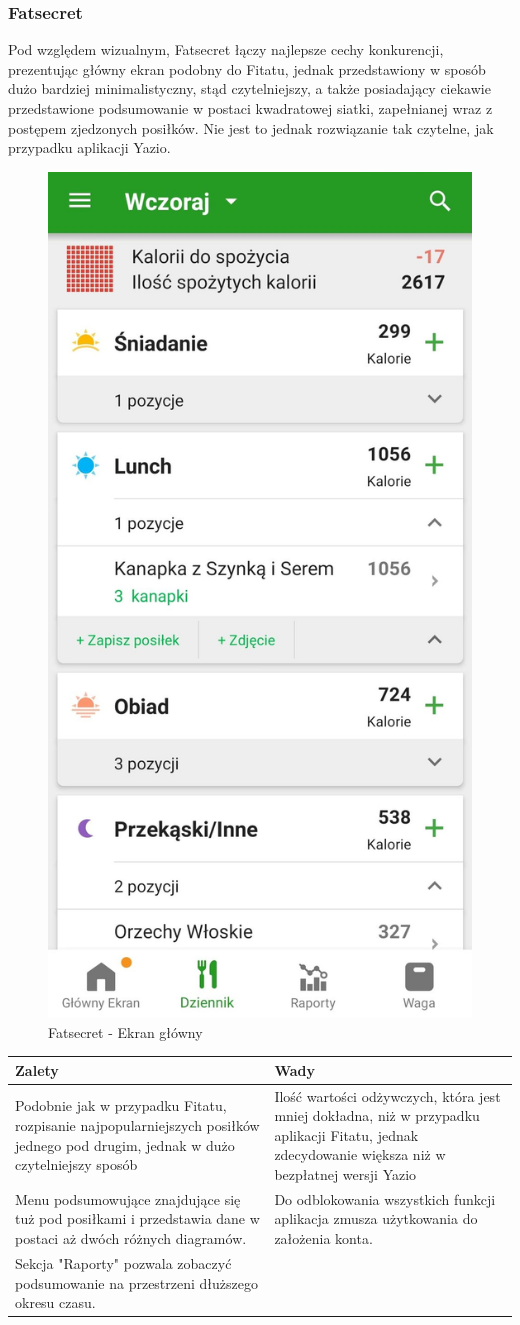 \documentclass[12pt, a4paper]{article}
\begin{document}
\begin{sloppypar}
{{    \subsubsection{Fatsecret}
    {
      Pod względem wizualnym, Fatsecret łączy najlepsze cechy konkurencji, prezentując
      główny ekran podobny do Fitatu, jednak przedstawiony w sposób dużo bardziej 
      minimalistyczny, stąd czytelniejszy, a także posiadający ciekawie przedstawione 
      podsumowanie w postaci kwadratowej siatki, zapełnianej wraz z postępem zjedzonych posiłków.
      Nie jest to jednak rozwiązanie tak czytelne, jak przypadku aplikacji Yazio.
      \begin{figure}[H]
        \centering
        \includegraphics[width=.3\textwidth]{fatsecret_1.png}
        \caption{Fatsecret - Ekran główny}
        \label{fig:fat1}
      \end{figure} 
      
      \begin{center}
        \begin{tabularx}{ \textwidth } {
          | >{\centering\arraybackslash}X
          | >{\centering\arraybackslash}X
          | }
         \hline
         \bfseries Zalety & \bfseries Wady \\
         \hline
         Podobnie jak w przypadku Fitatu, rozpisanie najpopularniejszych posiłków
         jednego pod drugim, jednak w dużo czytelniejszy sposób & 
         Ilość wartości odżywczych, która jest mniej dokładna, niż w przypadku aplikacji 
         Fitatu, jednak zdecydowanie większa niż w bezpłatnej wersji Yazio \\
         \hline
         Menu podsumowujące znajdujące się tuż pod posiłkami i przedstawia dane w
         postaci aż dwóch różnych diagramów. & 
         Do odblokowania wszystkich funkcji aplikacja zmusza użytkowania do założenia
         konta. \\
         \hline
         Sekcja "Raporty" pozwala zobaczyć podsumowanie na przestrzeni dłuższego okresu
         czasu. &
          \\
         \hline
        \end{tabularx}
      \end{center}
      
}}}
\end{sloppypar}
\end{document}
